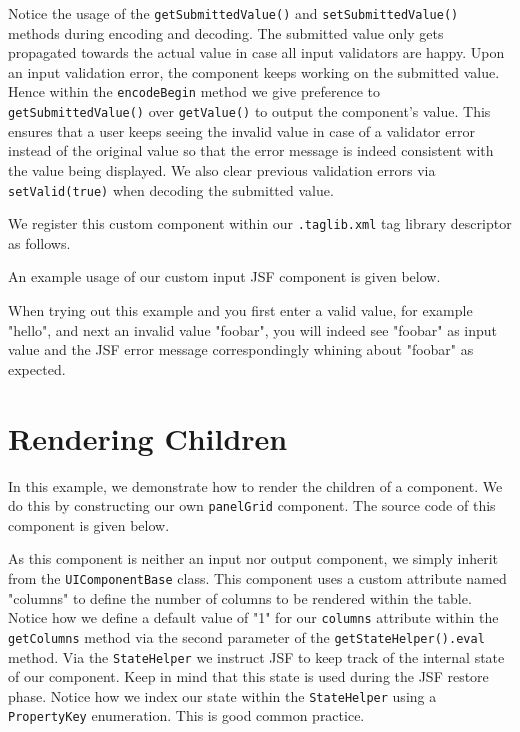 Notice the usage of the \texttt{getSubmittedValue()} and \texttt{setSubmittedValue()} methods during encoding and decoding.
The submitted value only gets propagated towards the actual value in case all input validators are happy.
Upon an input validation error, the component keeps working on the submitted value.
Hence within the \texttt{encodeBegin} method we give preference to \texttt{getSubmittedValue()} over \texttt{getValue()} to output the component's value.
This ensures that a user keeps seeing the invalid value in case of a validator error instead of the original value so that the error message is indeed consistent with the value being displayed.
We also clear previous validation errors via \texttt{setValid(true)} when decoding the submitted value.

We register this custom component within our \texttt{.taglib.xml} tag library descriptor as follows.


An example usage of our custom input JSF component is given below.

When trying out this example and you first enter a valid value, for example "hello", and next an invalid value "foobar", you will indeed see "foobar" as input value and the JSF error message correspondingly whining about "foobar" as expected.

\section{Rendering Children}
In this example, we demonstrate how to render the children of a component.
We do this by constructing our own \texttt{panelGrid} component.
The source code of this component is given below.

As this component is neither an input nor output component, we simply inherit from the \texttt{UIComponentBase} class.
This component uses a custom attribute named "columns" to define the number of columns to be rendered within the table.
Notice how we define a default value of "1" for our \texttt{columns} attribute within the \texttt{getColumns} method via the second parameter of the \texttt{getStateHelper().eval} method.
Via the \texttt{StateHelper} we instruct JSF to keep track of the internal state of our component.
Keep in mind that this state is used during the JSF restore phase.
Notice how we index our state within the \texttt{StateHelper} using a \texttt{PropertyKey} enumeration.
This is good common practice.

